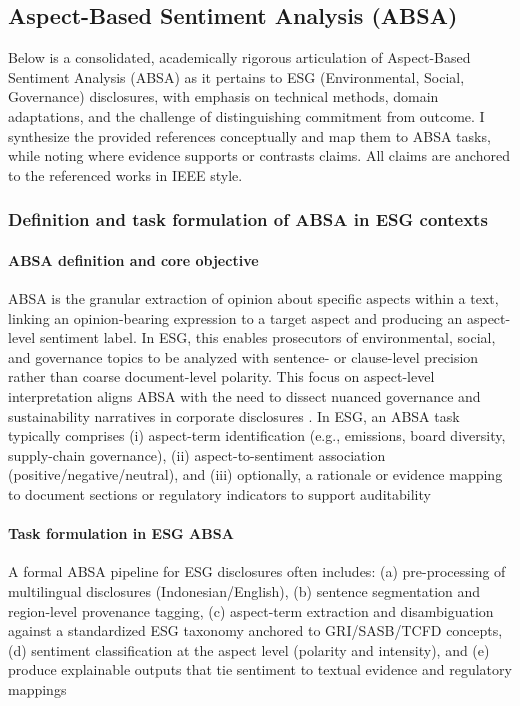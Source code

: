 \subsection{Aspect-Based Sentiment Analysis (ABSA)}
Below is a consolidated, academically rigorous articulation of Aspect-Based Sentiment Analysis (ABSA) as it pertains to ESG (Environmental, Social, Governance) disclosures, with emphasis on technical methods, domain adaptations, and the challenge of distinguishing commitment from outcome. I synthesize the provided references conceptually and map them to ABSA tasks, while noting where evidence supports or contrasts claims. All claims are anchored to the referenced works in IEEE style.

\subsubsection{Definition and task formulation of ABSA in ESG contexts}

\paragraph{ABSA definition and core objective}
ABSA is the granular extraction of opinion about specific aspects within a text, linking an opinion-bearing expression to a target aspect and producing an aspect-level sentiment label. In ESG, this enables prosecutors of environmental, social, and governance topics to be analyzed with sentence- or clause-level precision rather than coarse document-level polarity. This focus on aspect-level interpretation aligns ABSA with the need to dissect nuanced governance and sustainability narratives in corporate disclosures \cite{10.1002/csr.70089,10.3390/math12193119,10.2139/ssrn.3738629,10.1111/eufm.12509}
.
In ESG, an ABSA task typically comprises (i) aspect-term identification (e.g., emissions, board diversity, supply-chain governance), (ii) aspect-to-sentiment association (positive/negative/neutral), and (iii) optionally, a rationale or evidence mapping to document sections or regulatory indicators to support auditability \cite{10.1002/csr.70089,10.1111/eufm.12509,10.3390/math12193119}
\paragraph{Task formulation in ESG ABSA}
A formal ABSA pipeline for ESG disclosures often includes: (a) pre-processing of multilingual disclosures (Indonesian/English), (b) sentence segmentation and region-level provenance tagging, (c) aspect-term extraction and disambiguation against a standardized ESG taxonomy anchored to GRI/SASB/TCFD concepts, (d) sentiment classification at the aspect level (polarity and intensity), and (e) produce explainable outputs that tie sentiment to textual evidence and regulatory mappings \cite{10.1002/csr.70089,10.1111/eufm.12509,10.3390/math12193119,10.21203/rs.3.rs-3600821/v1,10.1111/1911-3846.12832}

